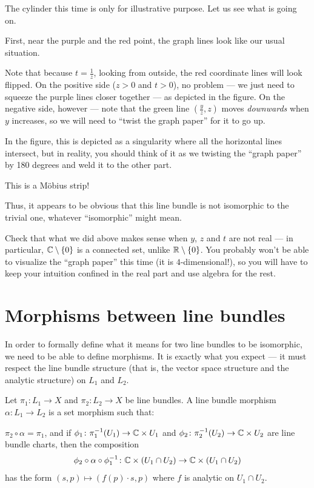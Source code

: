 The cylinder this time is only for illustrative purpose. Let us see what is going on.
\begin{itemize}
	\ii First, near the purple and the red point, the graph lines look like our usual situation.

	Note that because $t = \frac{1}{z}$, looking from outside, the red coordinate lines will look
	flipped.
	\ii On the positive side ($z > 0$ and $t > 0$), no problem --- we just need to squeeze the
	purple lines closer together --- as depicted in the figure.
	\ii On the negative side, however --- note that the green line $(\frac{y}{z}, z)$ moves
	\emph{downwards} when $y$ increases, so we will need to ``twist the graph paper'' for it to go
	up.

	In the figure, this is depicted as a singularity where all the horizontal lines intersect, but
	in reality, you should think of it as we twisting the ``graph paper'' by 180 degrees
	and weld it to the other part.
\end{itemize}

This is a M\"obius strip!

Thus, it appears to be obvious that this line bundle is not isomorphic to the trivial one,
whatever ``isomorphic'' might mean.

\begin{ques}
	Check that what we did above makes sense when $y$, $z$ and $t$ are not real --- in particular,
	$\mathbb C \setminus \{ 0 \}$ is a connected set, unlike $\mathbb R \setminus \{ 0 \}$.
	You probably won't be able to visualize the ``graph paper'' this time (it is
	$4$-dimensional!), so you will have to keep your intuition confined in the real part and use
	algebra for the rest.
\end{ques}

\section{Morphisms between line bundles}

In order to formally define what it means for two line bundles to be isomorphic, we need to be able
to define morphisms.
It is exactly what you expect --- it must respect the line bundle structure (that is, the vector
space structure and the analytic structure) on $L_1$ and $L_2$.

\begin{definition}
	Let $\pi_1 \colon L_1 \to X$ and $\pi_2 \colon L_2 \to X$ be line bundles.
	A line bundle morphism $\alpha \colon L_1 \to L_2$ is a set morphism such that:
	\begin{itemize}
		\ii $\pi_2 \circ \alpha = \pi_1$, and
		\ii if $\phi_1 \colon \pi_1^{-1}(U_1) \to \mathbb C \times U_1$
		and $\phi_2 \colon \pi_2^{-1}(U_2) \to \mathbb C \times U_2$
		are line bundle charts, then the composition
		\[ \phi_2 \circ \alpha \circ \phi_1^{-1} \colon
			\mathbb C \times (U_1 \cap U_2) \to \mathbb C \times (U_1 \cap U_2) \]
		has the form $(s, p) \mapsto (f(p) \cdot s, p)$ where $f$ is analytic on $U_1 \cap U_2$.
	\end{itemize}
\end{definition}


